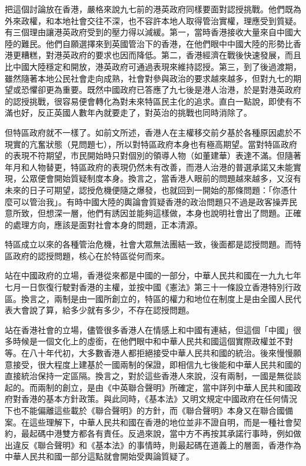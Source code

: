 把這個討論放在香港，嚴格來說九七前的港英政府同樣要面對認授挑戰。他們既為外來政權，和本地社會交往不深，也不容許本地人取得管治實權，理應受到質疑。有三個理由讓港英政府受到的壓力得以減緩。第一，當時香港接收大量來自中國大陸的難民。他們自願選擇來到英國管治下的香港，在他們眼中中國大陸的形勢比香港更糟糕，對港英政府的要求也因而降低。第二，香港經濟在戰後快速發展，而且比中國大陸穩定和開放，港英政府可通過表現來維持認授。第三，到了後過渡期，雖然隨著本地公民社會走向成熟，社會對參與政治的要求越來越多，但對九七的期望或恐懼卻更為重要。既然中國政府已答應了九七後是港人治港，於是對港英政府的認授挑戰，很容易便會轉化為對未來特區民主化的追求。直白一點說，即使有不滿也好，反正英國人數年內就要走了，對英治的挑戰也同時消除了。

但特區政府就不一樣了。如前文所述，香港人在主權移交前夕基於各種原因處於不現實的亢奮狀態（見問題七），所以對特區政府本身也有極高期望。當對特區政府的表現不符期望，市民開始時只對個別的領導人物（如董建華）表達不滿。但隨著年月和人物替更，特區政府的表現仍然未有改善，而港人治港的普選承諾又未能實現，公眾便會開始質疑制度本身。換言之，當香港人眼前的問題越來越多，又沒有未來的日子可期望，認授危機便隨之爆發，也就回到一開始的那條問題：「你憑什麼可以管治我」。有時中國大陸的輿論會質疑香港的政治問題只不過是政客操弄民意所致，但想深一層，他們有誘因並能夠這樣做，本身也說明社會出了問題。正確的處理方向，應該是面對社會本身的問題，正本清源。

特區成立以來的各種管治危機，社會大眾無法團結一致，後面都是認授問題。而特區政府的認授問題，核心在於特區從何而來。

站在中國政府的立場，香港從來都是中國的一部分，中華人民共和國在一九九七年七月一日恢復行駛對香港的主權，並按中國《憲法》第三十一條設立香港特別行政區。換言之，兩制是由一國所創立的，特區的權力和地位在制度上是由全國人民代表大會說了算，給多少就有多少，不存在認授問題。

站在香港社會的立場，儘管很多香港人在情感上和中國有連結，但這個「中國」很多時候是一個文化上的虛銜，在他們眼中和中華人民共和國這個實際政權並不對等。在八十年代初，大多數香港人都拒絕接受中華人民共和國的統治。後來慢慢願意接受，很大程度上建基於一國兩制的保證，即相信九七後能和中華人民共和國的直接統治保持一定區隔。換言之，對於這些香港人來說，沒有兩制，一國是無從談起的。而兩制的創立，是由《中英聯合聲明》所確定，當中詳列中華人民共和國政府對香港的基本方針政策。與此同時，《基本法》又明文規定中國政府在任何情況下也不能偏離這些載於《聯合聲明》的方針，而《聯合聲明》本身又在聯合國備案。在這些理解下，中華人民共和國在香港的地位並非不證自明，而是一種社會契約，最起碼中港雙方都各有責任。反過來說，當中方不再按其承諾行事時，例如做出違反《聯合聲明》和《基本法》的事情時，則最起碼在道義上的層面，香港作為中華人民共和國一部分這點就會開始受輿論質疑了。

